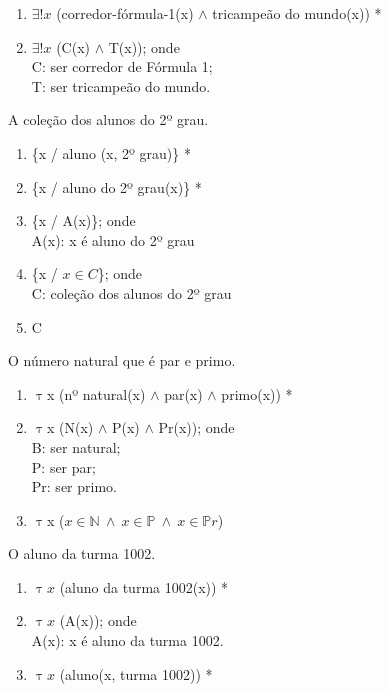 \begin{enumerate}[label=(\roman*)]
    \item $\exists!x$ (corredor-fórmula-1(x) $\land$ tricampeão do mundo(x)) *
    \item $\exists!x$ (C(x) $\land$ T(x)); onde\\
    C: ser corredor de Fórmula 1;\\
    T: ser tricampeão do mundo.
\end{enumerate}

\bigskip
\begin{exemplo} A coleção dos alunos do 2º grau.
\end{exemplo}

\begin{enumerate}[label=(\roman*)]
    \item \{x / aluno (x, 2º grau)\} *
    \item \{x / aluno do 2º grau(x)\} *
    \item \{x / A(x)\}; onde\\
    A(x): x é aluno do 2º grau
    \item \{x / $x \in C$\}; onde\\
    C: coleção dos alunos do 2º grau
    \item C
\end{enumerate}

\bigskip
\begin{exemplo} O número natural que é par e primo.
\end{exemplo}

\begin{enumerate}[label=(\roman*)]
    \item $\uptau$x (nº natural(x) $\land$ par(x) $\land$ primo(x)) *
    \item $\uptau$x (N(x) $\land$ P(x) $\land$ Pr(x)); onde\\
    B: ser natural;\\
    P: ser par;\\
    Pr: ser primo.
    \item $\uptau$x ($x \in \mathbb{N}\ \land\ x \in \mathbb{P}\ \land\ x \in \mathbb{P} r$)
\end{enumerate}

\bigskip

\begin{exemplo} O aluno da turma 1002.
\end{exemplo}

\begin{enumerate}[label=(\roman*)]
    \item $\uptau x$ (aluno da turma 1002(x)) *
    \item $\uptau x$ (A(x)); onde\\
    A(x): x é aluno da turma 1002.
    \item $\uptau x$ (aluno(x, turma 1002)) *
\end{enumerate}

